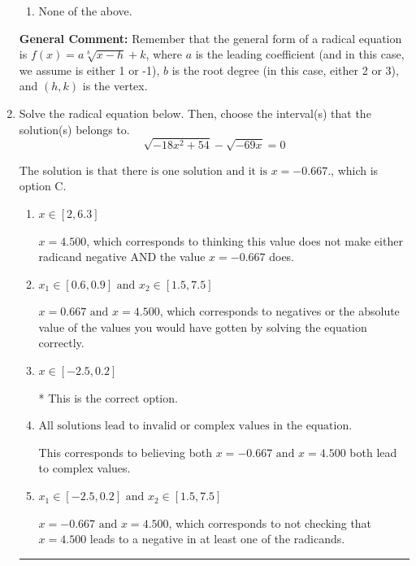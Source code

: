 \documentclass{extbook}[14pt]
\newcommand{\litem}[1]{\item #1

\rule{\textwidth}{0.4pt}}
\begin{document}
\begin{enumerate}
{\begin{enumerate}[label=\Alph*.]
\item None of the above.\end{enumerate}
\textbf{General Comment:} Remember that the general form of a radical equation is $ f(x) = a \sqrt[b]{x - h} + k $, where $a$ is the leading coefficient (and in this case, we assume is either 1 or -1), $b$ is the root degree (in this case, either 2 or 3), and $(h, k)$ is the vertex.
}
\litem{
Solve the radical equation below. Then, choose the interval(s) that the solution(s) belongs to.
\[ \sqrt{-18 x^2 + 54} - \sqrt{-69 x} = 0 \]

The solution is \( \text{that there is one solution and it is } x = -0.667. \), which is option C.\begin{enumerate}[label=\Alph*.]
\item \( x \in [2,6.3] \)

$x = 4.500$, which corresponds to thinking this value does not make either radicand negative AND the value $x = -0.667$ does.
\item \( x_1 \in [0.6, 0.9] \text{ and } x_2 \in [1.5,7.5] \)

$x = 0.667 \text{ and } x = 4.500$, which corresponds to negatives or the absolute value of the values you would have gotten by solving the equation correctly.
\item \( x \in [-2.5,0.2] \)

* This is the correct option.
\item \( \text{All solutions lead to invalid or complex values in the equation.} \)

This corresponds to believing both $x = -0.667 \text{ and } x = 4.500$ both lead to complex values.
\item \( x_1 \in [-2.5, 0.2] \text{ and } x_2 \in [1.5,7.5] \)

$x = -0.667 \text{ and } x = 4.500$, which corresponds to not checking that $x = 4.500$ leads to a negative in at least one of the radicands.
\end{enumerate}

}
\end{enumerate}
\end{document}
